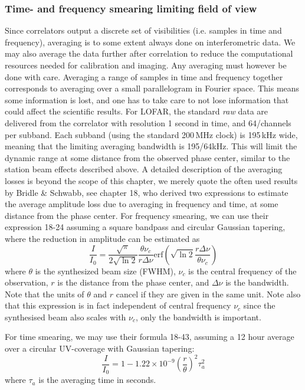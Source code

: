 \subsubsection{Time- and frequency smearing limiting field of view}
Since correlators output a discrete set of visibilities (i.e. samples in time
and frequency), averaging is to some extent always done on interferometric
data. We may also average the data further after correlation to reduce the
computational resources needed for calibration and imaging. Any averaging must
however be done with care.  Averaging a range of samples in time and frequency
together corresponds to averaging over a small parallelogram in Fourier space.
This means some information is lost, and one has to take care to not lose
information that could affect the scientific results. For LOFAR, the standard
\emph{raw} data are delivered from the correlator with resolution 1 second in
time, and 64/channels per subband.  Each subband (using the standard 200\,MHz
clock) is 195\,kHz wide, meaning that the limiting averaging bandwidth is
195/64kHz. This will limit the dynamic range at some distance from the observed
phase center, similar to the station beam effects described above.
A detailed description of the 
averaging losses is beyond the scope of this chapter, we merely quote
the often used results by Bridle \& Schwabb, see \cite{NRAO} chapter 18, who derived two expressions to estimate
the average amplitude loss due to averaging in frequency and time, at 
some distance from the phase center. For frequency smearing, we can use 
their expression 18-24 assuming a square bandpass and circular Gaussian tapering, 
where the reduction in amplitude can be estimated as
\begin{equation}
\frac{I}{I_0} = \frac{\sqrt{\pi}}{2\sqrt{\ln{2}}}\frac{\theta \nu_c}{r \Delta \nu}\mathrm{erf}\left(\sqrt{\ln{2}}\frac{r \Delta\nu}{\theta \nu_c}\right)
\label{eqn:freqloss}
\end{equation}
where $\theta$ is the synthesized beam size (FWHM), $\nu_c$ is the central
frequency of the observation, $r$ is the distance from the phase center, and
$\Delta \nu$ is the bandwidth. Note that the units of $\theta$ and $r$ cancel
if they are given in the same unit. Note also that this expression is in fact
independent of central frequency $\nu_c$ since the synthesised beam also scales with
$\nu_c$, only the bandwidth is important.

For time smearing, we may use their formula 18-43, assuming a 12 hour average over a circular UV-coverage 
with Gaussian tapering:
\begin{equation}
\frac{I}{I_0} = 1-1.22\times 10^{-9}\left(\frac{r}{\theta}\right)^2\tau_a^2
\label{eqn:timeloss}
\end{equation}
where $\tau_a$ is the averaging time in seconds.

